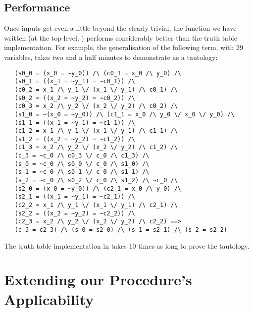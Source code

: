 \subsection{Performance}
\label{sec:dpll-performance}

Once inputs get even a little beyond the clearly trivial, the function
we have written (at the top-level, ) performs considerably
better than the truth table implementation.  For example, the
generalisation of the following term, with 29 variables, takes
 two and a half minutes to demonstrate as a tautology:
\begin{hol}
\begin{verbatim}
   (s0_0 = (x_0 = ~y_0)) /\ (c0_1 = x_0 /\ y_0) /\
   (s0_1 = ((x_1 = ~y_1) = ~c0_1)) /\
   (c0_2 = x_1 /\ y_1 \/ (x_1 \/ y_1) /\ c0_1) /\
   (s0_2 = ((x_2 = ~y_2) = ~c0_2)) /\
   (c0_3 = x_2 /\ y_2 \/ (x_2 \/ y_2) /\ c0_2) /\
   (s1_0 = ~(x_0 = ~y_0)) /\ (c1_1 = x_0 /\ y_0 \/ x_0 \/ y_0) /\
   (s1_1 = ((x_1 = ~y_1) = ~c1_1)) /\
   (c1_2 = x_1 /\ y_1 \/ (x_1 \/ y_1) /\ c1_1) /\
   (s1_2 = ((x_2 = ~y_2) = ~c1_2)) /\
   (c1_3 = x_2 /\ y_2 \/ (x_2 \/ y_2) /\ c1_2) /\
   (c_3 = ~c_0 /\ c0_3 \/ c_0 /\ c1_3) /\
   (s_0 = ~c_0 /\ s0_0 \/ c_0 /\ s1_0) /\
   (s_1 = ~c_0 /\ s0_1 \/ c_0 /\ s1_1) /\
   (s_2 = ~c_0 /\ s0_2 \/ c_0 /\ s1_2) /\ ~c_0 /\
   (s2_0 = (x_0 = ~y_0)) /\ (c2_1 = x_0 /\ y_0) /\
   (s2_1 = ((x_1 = ~y_1) = ~c2_1)) /\
   (c2_2 = x_1 /\ y_1 \/ (x_1 \/ y_1) /\ c2_1) /\
   (s2_2 = ((x_2 = ~y_2) = ~c2_2)) /\
   (c2_3 = x_2 /\ y_2 \/ (x_2 \/ y_2) /\ c2_2) ==>
   (c_3 = c2_3) /\ (s_0 = s2_0) /\ (s_1 = s2_1) /\ (s_2 = s2_2)
\end{verbatim}
\end{hol}
The truth table implementation in \ml{tautLib} takes 10 times as long
to prove the tautology.

\section{Extending our Procedure's Applicability}
\label{sec:dpll-applicability-extension}




